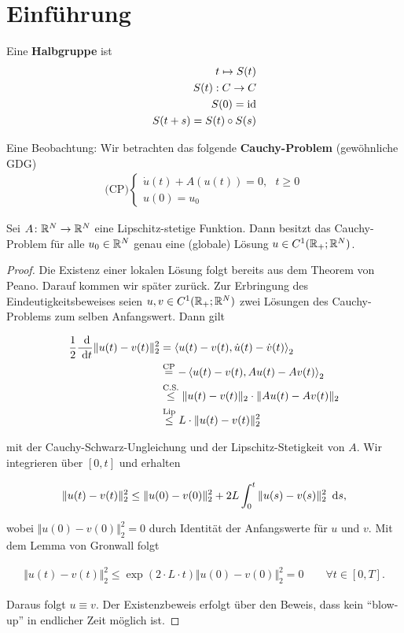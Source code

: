 \setcounter{chapter}{-1}

\chapter{Einführung}
Eine \textbf{Halbgruppe} ist
\begin{align*}
t\mapsto S(t)\\
S(t):C\to C\\
S(0)=\text{id}\\
S(t+s)=S(t)\circ S(s)
\end{align*}

Eine Beobachtung: Wir betrachten das folgende \textbf{Cauchy-Problem} (gewöhnliche GDG)
\begin{align}\label{CauchyProblem}
(\text{CP)}\left\lbrace\begin{array}{cl}
	\dot{u}(t)+A(u(t))=0,~~~t\geq0\\
	u(0) =u_0
\end{array}\right.
\end{align}

\begin{theorem}
Sei $A\colon\mathbb{R}^N\to\mathbb{R}^N$ eine Lipschitz-stetige Funktion. Dann besitzt das Cauchy-Problem für alle $u_0\in\mathbb{R}^N$ genau eine (globale) Lösung $u\in C^1(\mathbb{R}_+;\mathbb{R}^N)$.
\end{theorem}
\begin{proof}
Die Existenz einer lokalen Lösung folgt bereits aus dem Theorem von Peano. Darauf kommen wir später zurück. Zur Erbringung des Eindeutigkeitsbeweises seien $u,v\in C^1(\mathbb{R}_+;\mathbb{R}^N)$ zwei Lösungen des Cauchy-Problems zum selben Anfangswert. Dann gilt 

\begin{align*}
	\frac{1}{2}\frac{\text{ d}}{\text{ d} t}\Vert u(t)-v(t)\Vert_2^2 & =\left\langle u(t)-v(t),\dot{u}(t)-\dot{v}(t)\right\rangle_2 \\
	& \stackrel{\text{CP}}{=}-\left\langle u(t)-v(t),Au(t)-Av(t)\right\rangle_2 \\
	& \stackrel{\text{C.S.}}{\leq}\Vert u(t)-v(t)\Vert_2\cdot\Vert Au(t)-Av(t)\Vert_2 \\
	& \stackrel{\text{Lip}}{\leq} L\cdot\Vert u(t)-v(t)\Vert_2^2
\end{align*}

mit der Cauchy-Schwarz-Ungleichung und der Lipschitz-Stetigkeit von $A$. Wir integrieren über $\left[0,t\right]$ und erhalten

\begin{align*}
	\Vert u(t)-v(t)\Vert_2^2\leq\Vert u(0)-v(0)\Vert_2^2+2L\int_0^t\Vert u(s)-v(s)\Vert_2^2\,\text{ d} s,
\end{align*}

wobei $\Vert u(0)-v(0)\Vert_2^2=0$ durch Identität der Anfangswerte für $u$ und $v$. Mit dem Lemma von Gronwall folgt 

\begin{align*}
	\Vert u(t)-v(t)\Vert_2^2\leq\exp(2\cdot L\cdot t)\Vert u(0)-v(0)\Vert_2^2=0\qquad\forall t\in\left[0,T\right].
\end{align*}

Daraus folgt $u\equiv v$. Der Existenzbeweis erfolgt über den Beweis, dass kein "`blow-up"' in endlicher Zeit möglich ist.
\end{proof}

